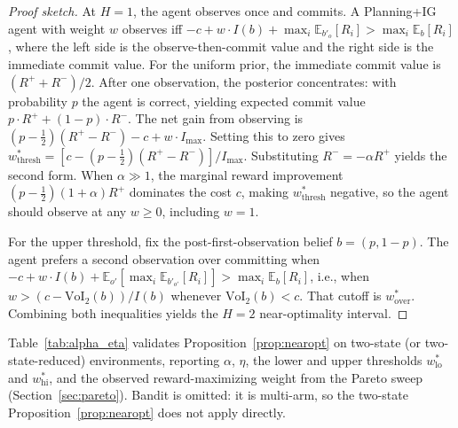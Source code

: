 \documentclass[runningheads]{llncs}
\begin{document}
\begin{proof}[Proof sketch]
At $H{=}1$, the agent observes once and commits. A Planning+IG agent with weight $w$ observes iff $-c + w \cdot I(b) + \max_i \mathbb{E}_{b'_o}[R_i] > \max_i \mathbb{E}_b[R_i]$, where the left side is the observe-then-commit value and the right side is the immediate commit value. For the uniform prior, the immediate commit value is $(R^+ + R^-)/2$. After one observation, the posterior concentrates: with probability $p$ the agent is correct, yielding expected commit value $p \cdot R^+ + (1-p) \cdot R^-$. The net gain from observing is $(p - \frac{1}{2})(R^+ - R^-) - c + w \cdot I_{\max}$. Setting this to zero gives $w^*_{\mathrm{thresh}} = [c - (p-\frac{1}{2})(R^+ - R^-)]/I_{\max}$. Substituting $R^- = -\alpha R^+$ yields the second form. When $\alpha \gg 1$, the marginal reward improvement $(p - \frac{1}{2})(1 + \alpha)R^+$ dominates the cost $c$, making $w^*_{\mathrm{thresh}}$ negative, so the agent should observe at any $w \geq 0$, including $w{=}1$.

For the upper threshold, fix the post-first-observation belief $b{=}(p,1{-}p)$. The agent prefers a second observation over committing when $-c + w \cdot I(b) + \mathbb{E}_{o'}[\max_i \mathbb{E}_{b'_{o'}}[R_i]] > \max_i \mathbb{E}_b[R_i]$, i.e., when $w > (c - \mathrm{VoI}_2(b))/I(b)$ whenever $\mathrm{VoI}_2(b) < c$. That cutoff is $w^*_{\mathrm{over}}$. Combining both inequalities yields the $H{=}2$ near-optimality interval.
\end{proof}

Table~\ref{tab:alpha_eta} validates Proposition~\ref{prop:nearopt} on two-state (or two-state-reduced) environments, reporting $\alpha$, $\eta$, the lower and upper thresholds $w^*_{\mathrm{lo}}$ and $w^*_{\mathrm{hi}}$, and the observed reward-maximizing weight from the Pareto sweep (Section~\ref{sec:pareto}). Bandit is omitted: it is multi-arm, so the two-state Proposition~\ref{prop:nearopt} does not apply directly.
\end{document}
